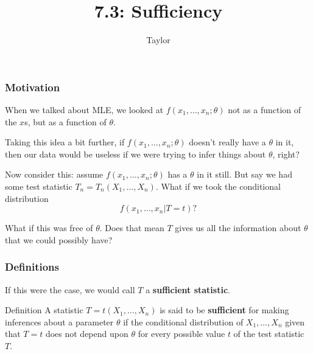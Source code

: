 \documentclass{beamer}
\title["7.3"]{7.3: Sufficiency}
\author{Taylor}
\institute[UVA] 
{
University of Virginia \\
\medskip
\textit{} 
}
\date{}
\begin{document}

\begin{frame}
\titlepage 
\end{frame}

\begin{frame}
\frametitle{Motivation}

When we talked about MLE, we looked at $f(x_1, \ldots, x_n ; \theta)$ not as a function of the $x$s, but as a function of $\theta$.
\newline

Taking this idea a bit further, if $f(x_1, \ldots, x_n ; \theta)$ doesn't really have a $\theta$ in it, then our data would be useless if we were trying to infer things about $\theta$, right?
\newline

Now consider this: assume $f(x_1, \ldots, x_n ; \theta)$ has a $\theta$ in it still. But say we had some test statistic $T_n = T_n(X_1, \ldots, X_n)$. What if we took the conditional distribution
\[
f(x_1, \ldots, x_n | T = t)?
\]

What if this was free of $\theta$. Does that mean $T$ gives us all the information about $\theta$ that we could possibly have?

\end{frame}

\begin{frame}
\frametitle{Definitions}

If this were the case, we would call $T$ a \textbf{sufficient statistic}.
\newline

\begin{block}{Definition}
A statistic $T = t(X_1, \ldots, X_n)$ is said to be \textbf{sufficient} for making inferences about a parameter $\theta$ if the conditional distribution of $X_1, \ldots, X_n$ given that $T = t$ does not depend upon $\theta$ for every possible value $t$ of the test statistic $T$.
\end{block}


\end{frame}
\end{document}
